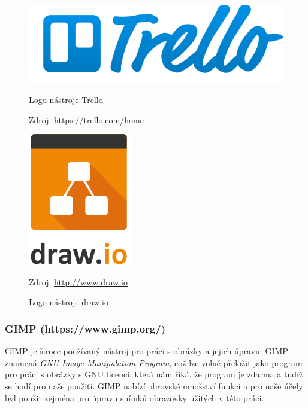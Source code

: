 \documentclass[czech,master,public,dept460,male,java,cpdeclaration]{diploma}
\begin{document}
\begin{figure}[H]
\begin{minipage}{.5\textwidth}
\centering
                \includegraphics[scale=0.3]{img/trello-logo-blue.png}
        \caption{Logo nástroje Trello}
                \label{fig:trellologo}
                \centering Zdroj: \url{https://trello.com/home}
\end{minipage}
\begin{minipage}{.5\textwidth}
\centering
                \includegraphics[scale=0.2]{img/drawiologo.png}
        \caption{Logo nástroje draw.io}
        \label{fig:iologo}
        \centering Zdroj: \url{http://www.draw.io}
    \end{minipage}
\end{figure}



\subsubsection{GIMP (https://www.gimp.org/)}
GIMP je široce používaný nástroj pro práci s obrázky a jejich úpravu. GIMP znamená
 \textit{GNU Image Manipulation Program}, což lze volně přeložit jako program pro práci s obrázky s GNU
 licencí, která nám říká, že program je zdarma a tudíž se hodí pro naše použití. GIMP nabízí obrovské
 množství funkcí a pro naše účely byl použit zejména pro úpravu snímků obrazovky užitých v této práci.
\end{document}
